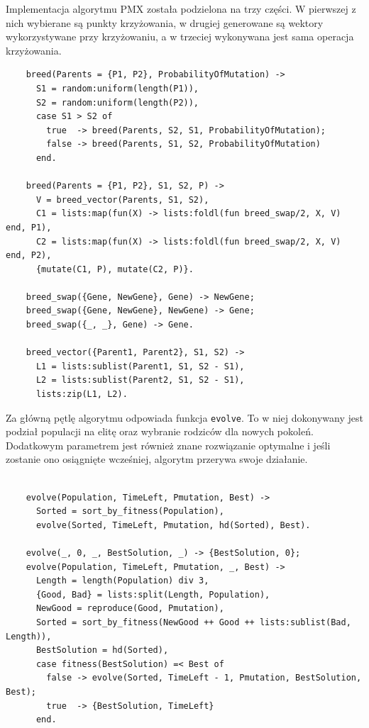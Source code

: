   Implementacja algorytmu PMX została podzielona na trzy części. W pierwszej z
  nich wybierane są punkty krzyżowania, w drugiej generowane są wektory
  wykorzystywane przy krzyżowaniu, a w trzeciej wykonywana jest sama operacja
  krzyżowania.
  \singlespacing
  \begin{center}
  \begin{verbatim}
    breed(Parents = {P1, P2}, ProbabilityOfMutation) ->
      S1 = random:uniform(length(P1)),
      S2 = random:uniform(length(P2)),
      case S1 > S2 of
        true  -> breed(Parents, S2, S1, ProbabilityOfMutation);
        false -> breed(Parents, S1, S2, ProbabilityOfMutation)
      end.

    breed(Parents = {P1, P2}, S1, S2, P) ->
      V = breed_vector(Parents, S1, S2),
      C1 = lists:map(fun(X) -> lists:foldl(fun breed_swap/2, X, V) end, P1),
      C2 = lists:map(fun(X) -> lists:foldl(fun breed_swap/2, X, V) end, P2),
      {mutate(C1, P), mutate(C2, P)}.

    breed_swap({Gene, NewGene}, Gene) -> NewGene;
    breed_swap({Gene, NewGene}, NewGene) -> Gene;
    breed_swap({_, _}, Gene) -> Gene.

    breed_vector({Parent1, Parent2}, S1, S2) ->
      L1 = lists:sublist(Parent1, S1, S2 - S1),
      L2 = lists:sublist(Parent2, S1, S2 - S1),
      lists:zip(L1, L2).
  \end{verbatim}
  \end{center}
  \onehalfspacing
  \vspace{1em}

  Za główną pętlę algorytmu odpowiada funkcja \texttt{evolve}. To w niej
  dokonywany jest podział populacji na elitę oraz wybranie rodziców dla nowych
  pokoleń. Dodatkowym parametrem jest również znane rozwiązanie optymalne i
  jeśli zostanie ono osiągnięte wcześniej, algorytm przerywa swoje działanie.
  \singlespacing
  \begin{center}
  \begin{verbatim}

    evolve(Population, TimeLeft, Pmutation, Best) ->
      Sorted = sort_by_fitness(Population),
      evolve(Sorted, TimeLeft, Pmutation, hd(Sorted), Best).

    evolve(_, 0, _, BestSolution, _) -> {BestSolution, 0};
    evolve(Population, TimeLeft, Pmutation, _, Best) ->
      Length = length(Population) div 3,
      {Good, Bad} = lists:split(Length, Population),
      NewGood = reproduce(Good, Pmutation),
      Sorted = sort_by_fitness(NewGood ++ Good ++ lists:sublist(Bad, Length)),
      BestSolution = hd(Sorted),
      case fitness(BestSolution) =< Best of
        false -> evolve(Sorted, TimeLeft - 1, Pmutation, BestSolution, Best);
        true  -> {BestSolution, TimeLeft}
      end.
  \end{verbatim}
  \end{center}
  \onehalfspacing
  \vspace{1em}

